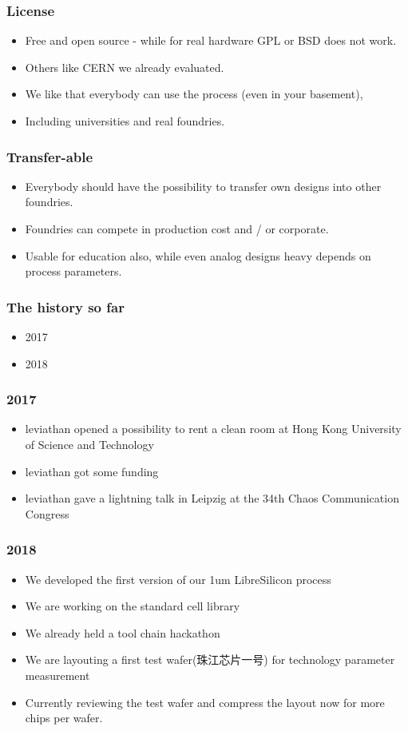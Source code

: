 \documentclass{beamer}
\begin{document}
\begin{frame}
	\frametitle{License}
	\begin{itemize}
		\item Free and open source - while for real hardware GPL or BSD does not work.
		\item Others like CERN we already evaluated.
		\item We like that everybody can use the process (even in your basement),
		\item Including universities and real foundries.
	\end{itemize}
\end{frame}

\begin{frame}
	\frametitle{Transfer-able}
	\begin{itemize}
		\item Everybody should have the possibility to transfer own designs into other foundries.
		\item Foundries can compete in production cost and / or corporate.
		\item Usable for education also, while even analog designs heavy depends on process parameters.
	\end{itemize}
\end{frame}

\begin{frame}
	\frametitle{The history so far}
	\begin{itemize}
		\item 2017
		\item 2018
	\end{itemize}
\end{frame}

\begin{frame}
	\frametitle{2017}
	\begin{itemize}
		\item leviathan opened a possibility to rent a clean room at Hong Kong University of Science and Technology
		\item leviathan got some funding
		\item leviathan gave a lightning talk in Leipzig at the 34th Chaos Communication Congress
	\end{itemize}
\end{frame}


\begin{frame}
	\frametitle{2018}
	\begin{itemize}
		\item We developed the first version of our 1um LibreSilicon process
		\item We are working on the standard cell library
		\item We already held a tool chain hackathon
		\item We are layouting a first test wafer(\cjkfont 珠江芯片一号) for technology parameter measurement
		\item Currently reviewing the test wafer and compress the layout now for more chips per wafer.
	\end{itemize}
\end{frame}
\end{document}
